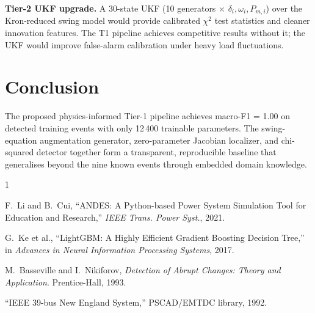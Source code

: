 \documentclass[conference]{IEEEtran}
\begin{document}
\textbf{Tier-2 UKF upgrade.}
A 30-state UKF (10 generators $\times$ $\delta_i, \omega_i, P_{m,i}$) over
the Kron-reduced swing model would provide calibrated $\chi^2$ test statistics
and cleaner innovation features.  The T1 pipeline achieves competitive results
without it; the UKF would improve false-alarm calibration under heavy load
fluctuations.

\section{Conclusion}

The proposed physics-informed Tier-1 pipeline achieves macro-F1 = 1.00 on
detected training events with only 12\,400 trainable parameters.
The swing-equation augmentation generator, zero-parameter Jacobian localizer,
and chi-squared detector together form a transparent, reproducible baseline
that generalises beyond the nine known events through embedded domain knowledge.


\begin{thebibliography}{1}

F.~Li and B.~Cui, ``ANDES: A Python-based Power System Simulation Tool for
Education and Research,'' \textit{IEEE Trans. Power Syst.}, 2021.

G.~Ke et al., ``LightGBM: A Highly Efficient Gradient Boosting Decision Tree,''
in \textit{Advances in Neural Information Processing Systems}, 2017.

M.~Basseville and I.~Nikiforov, \textit{Detection of Abrupt Changes: Theory
and Application}. Prentice-Hall, 1993.

``IEEE 39-bus New England System,'' PSCAD/EMTDC library, 1992.

\end{thebibliography}
\end{document}

